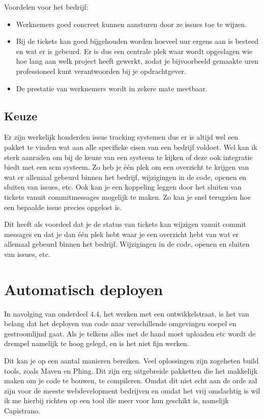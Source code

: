 Voordelen voor het bedrijf:

\begin{itemize}
  \item Werknemers goed concreet kunnen aansturen door ze issues toe te wijzen.
  \item Bij de tickets kan goed bijgehouden worden hoeveel uur ergens aan is besteed en wat er is gebeurd. Er is dus een centrale plek waar wordt opgeslagen wie hoe lang aan welk project heeft gewerkt, zodat je bijvoorbeeld gemaakte uren professioneel kunt verantwoorden bij je opdrachtgever.
  \item De prestatie van werknemers wordt in zekere mate meetbaar.
\end{itemize}

\subsection{Keuze}

Er zijn werkelijk honderden issue tracking systemen\cite{issuetracking} dus er is altijd wel een pakket te vinden wat aan alle specifieke eisen van een bedrijf voldoet. Wel kan ik sterk aanraden om bij de keuze van een systeem te kijken of deze ook integratie biedt met een {\sc scm} systeem. Zo heb je \'{e}\'{e}n plek om een overzicht te krijgen van wat er allemaal gebeurd binnen het bedrijf, wijzigingen in de code, openen en sluiten van issues, etc. Ook kan je een koppeling leggen door het sluiten van tickets vanuit commitmessages mogelijk te maken. Zo kan je snel terugzien hoe een bepaalde issue precies opgelost is.

Dit heeft als voordeel dat je de status van tickets kan wijzigen vanuit commit messages en dat je dan \'{e}\'{e}n plek hebt waar je een overzicht hebt van wat er allemaal gebeurd binnen het bedrijf. Wijzigingen in de code, openen en sluiten van issues, etc.

\section{Automatisch deployen}

In navolging van onderdeel 4.4, het werken met een ontwikkelstraat, is het van belang dat het deployen van code naar verschillende omgevingen soepel en gestroomlijnd gaat. Als je telkens alles met de hand moet uploaden etc wordt de drempel namelijk te hoog gelegd, en is het niet fijn werken.

Dit kan je op een aantal manieren bereiken. Veel oplossingen zijn zogeheten build tools, zoals Maven\cite{maven} en Phing\cite{phing}. Dit zijn erg uitgebreide pakketten die het makkelijk maken om je code te bouwen, te compileren. Omdat dit niet echt aan de orde zal zijn voor de meeste webdevelopment bedrijven en omdat het vrij omslachtig is wil ik me hierbij richten op een tool die meer voor hun geschikt is, namelijk Capistrano\cite{capistrano}.

